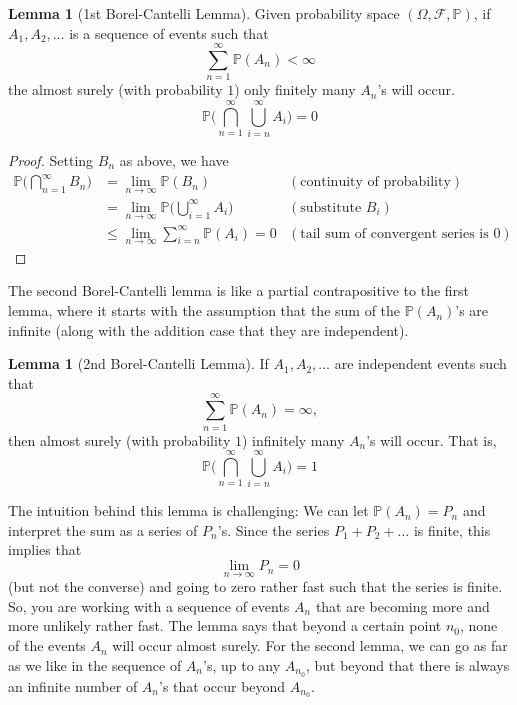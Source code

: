 \documentclass{article}
\theoremstyle{definition}
\newtheorem{lemma}[theorem]{Lemma}
\theoremstyle{remark}
\theoremstyle{definition}
\begin{document}
\begin{lemma}[1st Borel-Cantelli Lemma]
Given probability space $(\Omega, \mathcal{F}, \mathbb{P})$, if $A_1, A_2, \ldots$ is a sequence of events such that 
\[\sum_{n=1}^\infty \mathbb{P}(A_n) < \infty\]
the almost surely (with probability $1$) only finitely many $A_n$'s will occur. 
\[\mathbb{P} \bigg( \bigcap_{n=1}^\infty \bigcup_{i = n}^\infty A_i \bigg) = 0\]
\end{lemma}
\begin{proof}
Setting $B_n$ as above, we have 
\begin{align*}
    \mathbb{P}\bigg( \bigcap_{n=1}^\infty B_n \bigg) & = \lim_{n \rightarrow \infty} \mathbb{P}(B_n) & (\text{continuity of probability}) \\
    & = \lim_{n \rightarrow \infty} \mathbb{P} \bigg( \bigcup_{i=1}^\infty A_i \bigg) & (\text{substitute } B_i) \\
    & \leq \lim_{n \rightarrow \infty} \sum_{i = n}^\infty \mathbb{P}(A_i) = 0 & (\text{tail sum of convergent series is } 0)
\end{align*}
\end{proof}

The second Borel-Cantelli lemma is like a partial contrapositive to the first lemma, where it starts with the assumption that the sum of the $\mathbb{P}(A_n)$'s are infinite (along with the addition case that they are independent). 

\begin{lemma}[2nd Borel-Cantelli Lemma]
If $A_1, A_2, \ldots$ are independent events such that 
\[\sum_{n=1}^\infty \mathbb{P}(A_n) = \infty,\]
then almost surely (with probability $1$) infinitely many $A_n$'s will occur. That is, 
\[\mathbb{P} \bigg( \bigcap_{n=1}^\infty \bigcup_{i = n}^\infty A_i \bigg) = 1\]
\end{lemma}

The intuition behind this lemma is challenging: We can let $\mathbb{P}(A_n) = P_n$ and interpret the sum as a series of $P_n$'s. Since the series $P_1 + P_2 + \ldots$ is finite, this implies that 
\[\lim_{n \rightarrow \infty} P_n = 0\]
(but not the converse) and going to zero rather fast such that the series is finite. So, you are working with a sequence of events $A_n$ that are becoming more and more unlikely rather fast. The lemma says that beyond a certain point $n_0$, none of the events $A_n$ will occur almost surely. For the second lemma, we can go as far as we like in the sequence of $A_n$'s, up to any $A_{n_0}$, but beyond that there is always an infinite number of $A_n$'s that occur beyond $A_{n_0}$. 
\end{document}
